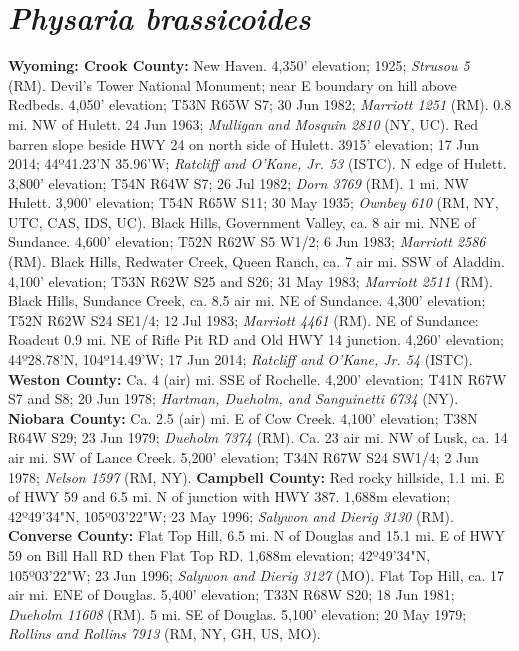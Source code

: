 \section*{\textit{Physaria brassicoides}}

  \textbf{Wyoming: Crook County:}
New Haven. 4,350' elevation; 1925; \textit{Strusou 5} (RM).
Devil's Tower National Monument; near E boundary on hill above Redbeds.
4,050' elevation; T53N R65W S7; 30 Jun 1982; \textit{Marriott 1251} (RM).
0.8 mi. NW of Hulett. 24 Jun 1963; \textit{Mulligan and Mosquin 2810} (NY, UC).
Red barren slope beside HWY 24 on north side of Hulett. 3915' elevation;
17 Jun 2014; 44º41.23'N 35.96'W; \textit{Ratcliff and O'Kane, Jr. 53} (ISTC).
N edge of Hulett. 3,800' elevation; T54N R64W S7; 26 Jul 1982;
\textit{Dorn 3769} (RM).
1 mi. NW Hulett. 3,900' elevation; T54N R65W S11; 30 May 1935;
\textit{Ownbey 610} (RM, NY, UTC, CAS, IDS, UC).
Black Hills, Government Valley, ca. 8 air mi. NNE of Sundance. 4,600' elevation;
T52N R62W S5 W1/2; 6 Jun 1983; \textit{Marriott 2586} (RM).
Black Hills, Redwater Creek, Queen Ranch, ca. 7 air mi. SSW of Aladdin. 4,100'
elevation; T53N R62W S25 and S26; 31 May 1983; \textit{Marriott 2511} (RM).
Black Hills, Sundance Creek, ca. 8.5 air mi. NE of Sundance. 4,300' elevation;
T52N R62W S24 SE1/4; 12 Jul 1983; \textit{Marriott 4461} (RM).
NE of Sundance: Roadcut 0.9 mi. NE of Rifle Pit RD and Old HWY 14 junction.
4,260' elevation; 44º28.78'N, 104º14.49'W;
17 Jun 2014; \textit{Ratcliff and O'Kane, Jr. 54} (ISTC).
  \textbf{Weston County:}
Ca. 4 (air) mi. SSE of Rochelle. 4,200' elevation; T41N R67W S7 and S8;
20 Jun 1978; \textit{Hartman, Dueholm, and Sanguinetti 6734} (NY).
  \textbf{Niobara County:}
Ca. 2.5 (air) mi. E of Cow Creek. 4,100' elevation; T38N R64W S29; 23 Jun 1979;
\textit{Dueholm 7374} (RM).
Ca. 23 air mi. NW of Lusk, ca. 14 air mi. SW of Lance Creek. 5,200' elevation;
T34N R67W S24 SW1/4; 2 Jun 1978; \textit{Nelson 1597} (RM, NY).
  \textbf{Campbell County:}
Red rocky hillside, 1.1 mi. E of HWY 59 and 6.5 mi. N of junction with HWY 387.
1,688m elevation; 42º49'34"N, 105º03'22"W; 23 May 1996;
\textit{Salywon and Dierig 3130} (RM).
  \textbf{Converse County:}
Flat Top Hill, 6.5 mi. N of Douglas and 15.1 mi. E of HWY 59 on Bill Hall RD
then Flat Top RD. 1,688m elevation; 42º49'34"N, 105º03'22"W;
23 Jun 1996; \textit{Salywon and Dierig 3127} (MO).
Flat Top Hill, ca. 17 air mi. ENE of Douglas. 5,400' elevation; T33N R68W S20;
18 Jun 1981; \textit{Dueholm 11608} (RM).
5 mi. SE of Douglas. 5,100' elevation; 20 May 1979;
\textit{Rollins and Rollins 7913} (RM, NY, GH, US, MO).
